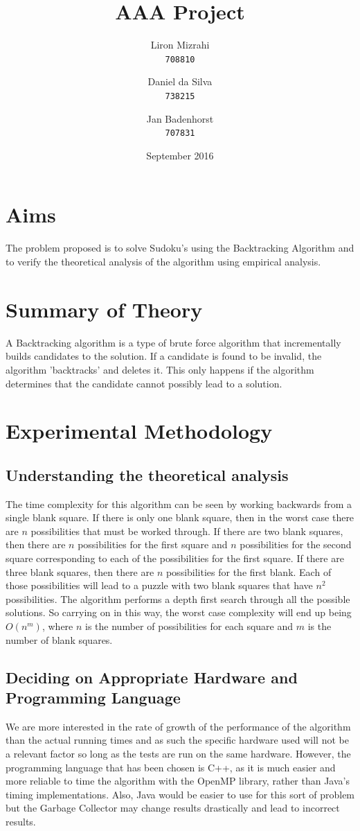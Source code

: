 \documentclass{article}
\title{AAA Project}
\date{September 2016}
\author{
  Liron Mizrahi\\
  \texttt{708810}
  \and
  Daniel da Silva\\
  \texttt{738215}
  \and
  Jan Badenhorst\\
  \texttt{707831}
}
\begin{document}
\maketitle

\section{Aims}
The problem proposed is to solve Sudoku's using the Backtracking Algorithm and to verify the theoretical analysis of the algorithm using empirical analysis.

\section{Summary of Theory}
A Backtracking algorithm is a type of brute force algorithm that incrementally builds candidates to the solution. If a candidate is found to be invalid, the algorithm 'backtracks' and deletes it. This only happens if the algorithm determines that the candidate cannot possibly lead to a solution.

\section{Experimental Methodology}
\subsection{Understanding the theoretical analysis}
The time complexity for this algorithm can be seen by working backwards from a single blank square. If there is only one blank square, then in the worst case there are $n$ possibilities that must be worked through. If there are two blank squares, then there are $n$ possibilities for the first square and $n$ possibilities for the second square corresponding to each of the possibilities for the first square. If there are three blank squares, then there are $n$ possibilities for the first blank. Each of those possibilities will lead to a puzzle with two blank squares that have $n^2$ possibilities.
The algorithm performs a depth first search through all the possible solutions. So carrying on in this way, the worst case complexity will end up being $O(n^m)$, where $n$ is the number of possibilities for each square and $m$ is the number of blank squares.

\newpage

\subsection{Deciding on Appropriate Hardware and Programming Language}
We are more interested in the rate of growth of the performance of the algorithm than the actual running times and as such the specific hardware used will not be a relevant factor so long as the tests are run on the same hardware. However, the programming language that has been chosen is C++, as it is much easier and more reliable to time the algorithm with the OpenMP library, rather than Java's timing implementations. Also, Java would be easier to use for this sort of problem but the Garbage Collector may change results drastically and lead to incorrect results.
\end{document}
